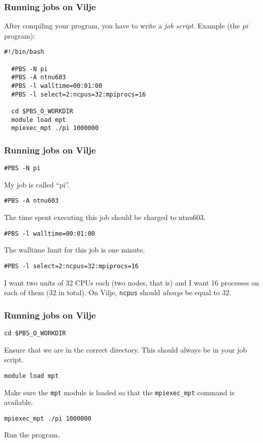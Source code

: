 \begin{frame}[fragile]
  \frametitle{Running jobs on Vilje}
  After compiling your program, you have to write a \emph{job script}. Example
  (the \emph{pi} program):
\begin{lstlisting}[style=shell]
  #!/bin/bash

  #PBS -N pi
  #PBS -A ntnu603
  #PBS -l walltime=00:01:00
  #PBS -l select=2:ncpus=32:mpiprocs=16

  cd $PBS_O_WORKDIR
  module load mpt
  mpiexec_mpt ./pi 1000000
\end{lstlisting}
\end{frame}

\begin{frame}[fragile]
  \frametitle{Running jobs on Vilje}
\begin{lstlisting}[style=shell]
  #PBS -N pi
\end{lstlisting}
  My job is called ``pi''.
\begin{lstlisting}[style=shell]
  #PBS -A ntnu603
\end{lstlisting}
  The time spent executing this job should be charged to ntnu603.
\begin{lstlisting}[style=shell]
  #PBS -l walltime=00:01:00
\end{lstlisting}
  The walltime limit for this job is one minute.
\begin{lstlisting}[style=shell]
  #PBS -l select=2:ncpus=32:mpiprocs=16
\end{lstlisting}
  I want two units of 32 CPUs each (two nodes, that is) and I want 16 processes
  on each of them (32 in total). On Vilje, \texttt{ncpus} should \emph{always}
  be equal to 32.
\end{frame}

\begin{frame}[fragile]
  \frametitle{Running jobs on Vilje}
\begin{lstlisting}[style=shell]
  cd $PBS_O_WORKDIR
\end{lstlisting}
  Ensure that we are in the correct directory. This should always be in your job
  script.
\begin{lstlisting}[style=shell]
  module load mpt
\end{lstlisting}
  Make sure the \texttt{mpt} module is loaded so that the \texttt{mpiexec\_mpt}
  command is available.
\begin{lstlisting}[style=shell]
  mpiexec_mpt ./pi 1000000
\end{lstlisting}
  Run the program.
\end{frame}

